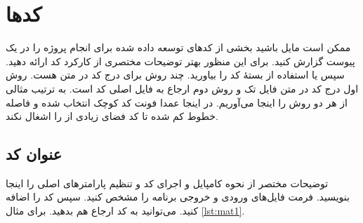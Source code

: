 \chapter{کدها}


ممکن است مایل باشید بخشی از کدهای توسعه داده شده برای انجام پروژه را در یک پیوست گزارش کنید. برای این منظور بهتر توضیحات مختصری از کارکرد کد ارائه دهید. سپس یا استفاده از بستهٔ 
کد را بیاورید. چند روش برای درج کد در متن هست. روش اول درج کد در متن فایل تک و روش دوم ارجاع به فایل اصلی کد است. به ترتیب مثالی از هر دو روش را اینجا می‌آوریم. در اینجا عمدا فونت کد کوچک انتخاب شده و فاصله خطوط کم شده تا کد فضای زیادی از 
\thesis 
را اشغال نکند.

\section{عنوان کد}
توضیحات مختصر از نحوه کامپایل و اجرای کد و تنظیم پارامترهای اصلی را اینجا بنویسید. فرمت فایل‌های ورودی و خروجی برنامه را مشخص کنید. سپس کد را اضافه کنید. می‌توانید به کد ارجاع هم بدهید. برای مثال
\ref{lst:mat1}.

